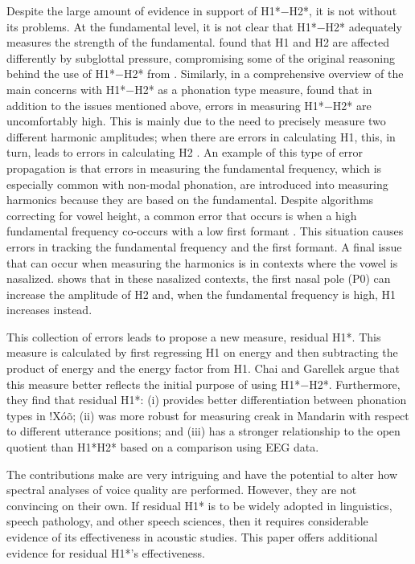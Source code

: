 Despite the large amount of evidence in support of H1*$-$H2*, it is not without its problems. At the fundamental level, it is not clear that H1*$-$H2* adequately measures the strength of the fundamental. \citet{sundbergObjectiveCharacterizationPhonation2022} found that H1 and H2 are affected differently by subglottal pressure, compromising some of the original reasoning behind the use of H1*$-$H2* from \citet{fischer-jorgensenPhoneticAnalysisBreathy1968}. Similarly, in a comprehensive overview of the main concerns with H1*$-$H2* as a phonation type measure, \citet{chaiH1H2Acoustic2022} found that in addition to the issues mentioned above, errors in measuring H1*$-$H2* are uncomfortably high. This is mainly due to the need to precisely measure two different harmonic amplitudes; when there are errors in calculating H1, this, in turn, leads to errors in calculating H2 \citep{arrasIntroductionErrorPropagation1998}. An example of this type of error propagation is that errors in measuring the fundamental frequency, which is especially common with non-modal phonation, are introduced into measuring harmonics because they are based on the fundamental. Despite algorithms correcting for vowel height, a common error that occurs is when a high fundamental frequency co-occurs with a low first formant \citep{chaiH1H2Acoustic2022}. This situation causes errors in tracking the fundamental frequency and the first formant. A final issue that can occur when measuring the harmonics is in contexts where the vowel is nasalized. \citet{simpsonFirstSecondHarmonics2012} shows that in these nasalized contexts, the first nasal pole (P0) can increase the amplitude of H2 and, when the fundamental frequency is high, H1 increases instead.

This collection of errors leads \citet{chaiH1H2Acoustic2022} to propose a new measure, residual H1*. This measure is calculated by first regressing H1 on energy and then subtracting the product of energy and the energy factor from H1. Chai and Garellek argue that this measure better reflects the initial purpose of using H1*$-$H2*. Furthermore, they find that residual H1*: (i) provides better differentiation between phonation types in !Xóõ; (ii) was more robust for measuring creak in Mandarin with respect to different utterance positions; and (iii) has a stronger relationship to the open quotient than H1*H2* based on a comparison using EEG data.

The contributions \citet{chaiH1H2Acoustic2022} make are very intriguing and have the potential to alter how spectral analyses of voice quality are performed. However, they are not convincing on their own. If residual H1* is to be widely adopted in linguistics, speech pathology, and other speech sciences, then it requires considerable evidence of its effectiveness in acoustic studies. This paper offers additional evidence for residual H1*'s effectiveness. 

